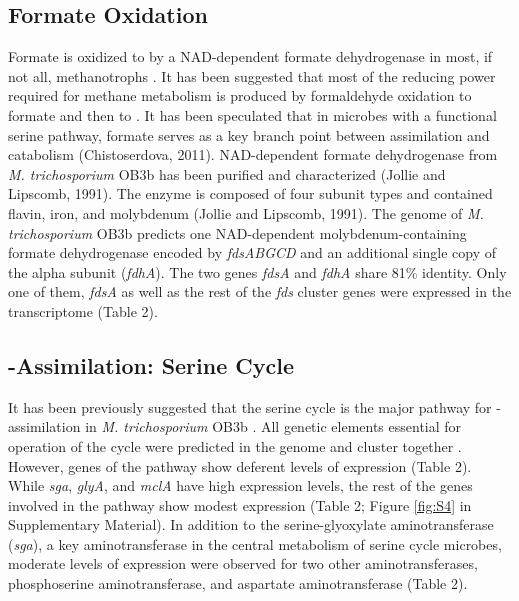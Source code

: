\subsection{Formate Oxidation}
Formate is oxidized to  by a NAD-dependent formate dehydrogenase in most, if not all, methanotrophs \cite{anthony1982}.
It has been suggested that most of the reducing power required for methane metabolism is produced by formaldehyde oxidation to formate and then to  \cite{hanson1996}.
It has been speculated that in microbes with a functional serine pathway, formate serves as a key branch point between assimilation and catabolism (Chistoserdova, 2011).
NAD-dependent formate dehydrogenase from \textit{M. trichosporium} OB3b has been purified and characterized (Jollie and Lipscomb, 1991).
The enzyme is composed of four subunit types and contained flavin, iron, and molybdenum (Jollie and Lipscomb, 1991).
The genome of \textit{M. trichosporium} OB3b predicts one NAD-dependent molybdenum-containing formate dehydrogenase encoded by \textit{fdsABGCD} and an additional single copy of the alpha subunit (\textit{fdhA}).
The two genes \textit{fdsA} and \textit{fdhA} share 81\% identity.
Only one of them, \textit{fdsA} as well as the rest of the \textit{fds} cluster genes were expressed in the transcriptome (Table 2).

\subsection{-Assimilation: Serine Cycle}
It has been previously suggested that the serine cycle is the major pathway for -assimilation in \textit{M. trichosporium} OB3b \cite{strom1974}.
All genetic elements essential for operation of the cycle were predicted in the genome and cluster together \cite{stein2010}.
However, genes of the pathway show deferent levels of expression (Table 2).
While \textit{sga}, \textit{glyA}, and \textit{mclA} have high expression levels, the rest of the genes involved in the pathway show modest expression (Table 2; Figure \ref{fig:S4} in Supplementary Material).
In addition to the serine-glyoxylate aminotransferase (\textit{sga}), a key aminotransferase in the central metabolism of serine cycle microbes, moderate levels of expression were observed for two other aminotransferases, phosphoserine aminotransferase, and aspartate aminotransferase (Table 2).

